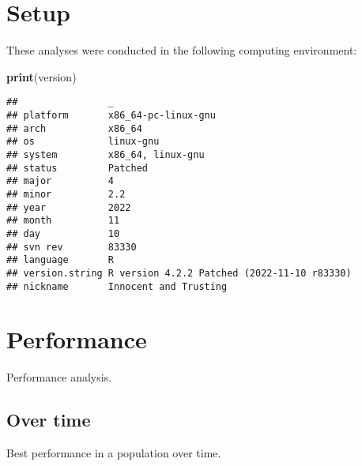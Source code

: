 \documentclass[]{book}
\newenvironment{Shaded}{\begin{snugshade}}{\end{snugshade}}
\newcommand{\KeywordTok}[1]{\textcolor[rgb]{0.13,0.29,0.53}{\textbf{#1}}}
\newcommand{\NormalTok}[1]{#1}
\begin{document}
\hypertarget{setup}{%
\section{Setup}\label{setup}}

These analyses were conducted in the following computing environment:

\begin{Shaded}
\begin{Highlighting}[]
\KeywordTok{print}\NormalTok{(version)}
\end{Highlighting}
\end{Shaded}

\begin{verbatim}
##                _                                          
## platform       x86_64-pc-linux-gnu                        
## arch           x86_64                                     
## os             linux-gnu                                  
## system         x86_64, linux-gnu                          
## status         Patched                                    
## major          4                                          
## minor          2.2                                        
## year           2022                                       
## month          11                                         
## day            10                                         
## svn rev        83330                                      
## language       R                                          
## version.string R version 4.2.2 Patched (2022-11-10 r83330)
## nickname       Innocent and Trusting
\end{verbatim}

\hypertarget{performance}{%
\section{Performance}\label{performance}}

Performance analysis.

\hypertarget{over-time}{%
\subsection{Over time}\label{over-time}}

Best performance in a population over time.
\end{document}
